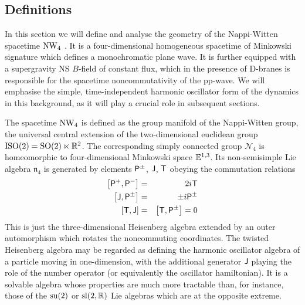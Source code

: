 \subsection{Definitions}
\label{NWPW}
In this section we will define and analyse the geometry of the Nappi-Witten
spacetime $\NW_4$ \cite{NW1}. It is a four-dimensional homogeneous spacetime of
Minkowski signature which defines a monochromatic plane wave. It is further
equipped with a supergravity NS $B$-field of constant flux, which in the
presence of D-branes is responsible for the spacetime noncommutativity of the
pp-wave. We will emphasise the simple, time-independent harmonic oscillator form
of the dynamics in this background, as it will play a crucial role in subsequent
sections.

The spacetime $\NW_4$ is defined as the group manifold of the Nappi-Witten
group, the universal central extension of the two-dimensional euclidean group
${\rm ISO}(2)={\rm SO}(2)\ltimes\R^2$. The corresponding simply connected
group $\mathcal N_4$ is homeomorphic to four-dimensional Minkowski space
$\E^{1,3}$. Its non-semisimple Lie algebra $\mathfrak n_4$ is generated by
elements $\P^\pm$, $\J$, $\T$ obeying the commutation relations
\begin{eqnarray}
  \label{NW4algdef}
  \left[\P^+ , \P^-\right]&=&2 i \T \nn\\
  \left[\J , \P^\pm\right]&=&\pm i \P^\pm \nn\\
  \left[\T , \J\right]&=&\left[\T , \P^\pm\right] = 0
\end{eqnarray}
This is just the three-dimensional Heisenberg algebra extended by an outer
automorphism which rotates the noncommuting coordinates. The twisted Heisenberg
algebra may be regarded as defining the harmonic oscillator algebra of a
particle moving in one-dimension, with the additional generator $\J$ playing the
role of the number operator (or equivalently the oscillator hamiltonian). It is
a solvable algebra whose properties are much more tractable than, for instance,
those of the ${\rm su}(2)$ or ${\rm sl}(2,\R)$ Lie algebras which are at the
opposite extreme.

